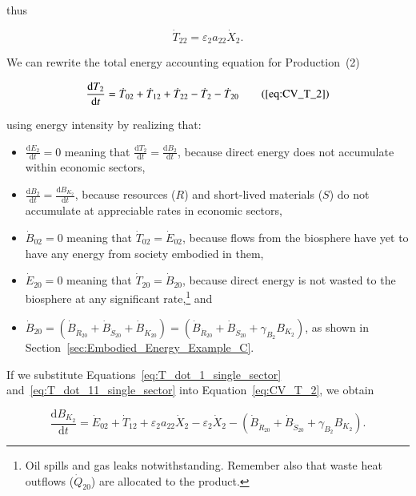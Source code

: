 \noindent{}thus

\begin{equation} \label{eq:T_dot_11_single_sector}
	\dot{T}_{22} = \varepsilon_{2}a_{22}\dot{X}_{2}.
\end{equation}

We can rewrite the total energy accounting equation 
for Production~(2)

\begin{equation}
	\frac{\mathrm{d}T_{2}}{\mathrm{d}t} 	 
	= \dot{T}_{02} 
	+ \dot{T}_{12}
	+ \dot{T}_{22} 
	- \dot{T}_{2} 
	- \dot{T}_{20} \tag{\ref{eq:CV_T_2}}
\end{equation}

\noindent{}using energy intensity by realizing that:

\begin{itemize}
	\item{$\frac{\mathrm{d}E_2}{\mathrm{d}t} = 0$
		meaning that
		$\frac{\mathrm{d}T_2}{\mathrm{d}t} = \frac{\mathrm{d}B_2}{\mathrm{d}t}$, 
		because direct energy
		does not accumulate within economic sectors,}
	\item{$\frac{\mathrm{d}B_2}{\mathrm{d}t} = \frac{\mathrm{d}B_{K_{2}}}{\mathrm{d}t}$,
		because resources ($R$) and short-lived materials ($S$) do not 
		accumulate at appreciable rates in economic sectors,}
	\item{$\dot{B}_{02} = 0$ meaning that $\dot{T}_{02} = \dot{E}_{02}$,
		because flows from the biosphere have yet to have any energy from society embodied in them,
		}
	\item{$\dot{E}_{20} = 0$ meaning that $\dot{T}_{20} = \dot{B}_{20}$, 
	because direct energy is not wasted to the biosphere at any significant rate,\footnote{Oil
	spills and gas leaks notwithstanding. Remember also that waste heat outflows ($\dot{Q}_{20}$)
	are allocated to the product.} and} 
	\item{$\dot{B}_{20} = \left( \dot{B}_{\dot{R}_{20}} 
							+ \dot{B}_{\dot{S}_{20}}
							+ \dot{B}_{\dot{K}_{20}}
							\right)
						= \left( \dot{B}_{\dot{R}_{20}} 
							+ \dot{B}_{\dot{S}_{20}}
							+ \gamma_{B_{2}} B_{K_{2}}
							\right)$, as shown in Section~\ref{sec:Embodied_Energy_Example_C}.}
\end{itemize}

\noindent{}If we substitute Equations~\ref{eq:T_dot_1_single_sector} 
and~\ref{eq:T_dot_11_single_sector} into Equation~\ref{eq:CV_T_2}, we obtain

\begin{equation} \label{eq:dB1/dt_single_sector_after_substituting_eps_and_a}
	\frac{\mathrm{d}B_{K_{2}}}{\mathrm{d}t} 
	= \dot{E}_{02} 
	+ \dot{T}_{12}
	+ \varepsilon_{2}a_{22}\dot{X}_{2} 
	- \varepsilon_{2}\dot{X}_{2} 
	- \left( \dot{B}_{\dot{R}_{20}} 
							+ \dot{B}_{\dot{S}_{20}}
							+ \gamma_{B_{2}} B_{K_{2}}
							\right).
\end{equation}

